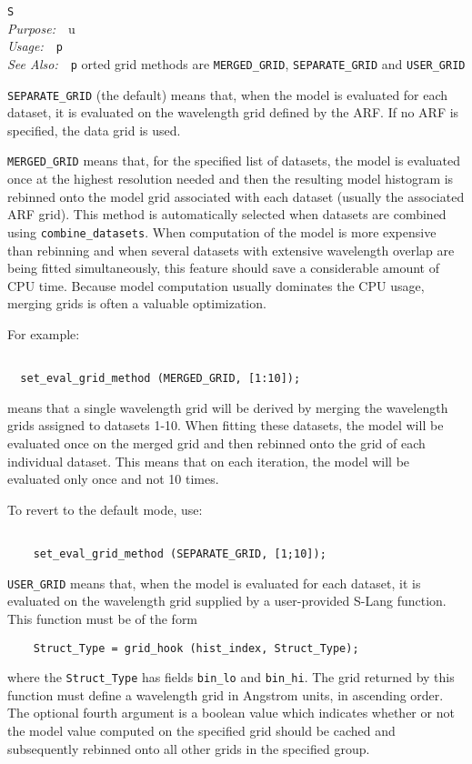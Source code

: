 \documentclass{book}
\makeatletter
\newif\ifpdf
\newenvironment{isisfunction}[4]%
{\index{{#1}@{\tt #1}}%
  \ifpdf
  \else
     \addcontentsline{toc}{subsection}{{#1} -- {#2}}
  \fi
  \vbox{
          \vspace*{\baselineskip}
          {\LARGE\tt #1}\vspace*{\baselineskip}\\
          {{\it Purpose:}~~{#2}}\\
          {{\it Usage:}~~{\tt #3}}\\
          {{\it See Also:}~~{\tt #4}}
       }
}%
{ }
\makeatother
\begin{document}
{\begin{isisfunction}
Supported grid methods are \verb|MERGED_GRID|,
\verb|SEPARATE_GRID| and \verb|USER_GRID|

\verb|SEPARATE_GRID| (the default) means that, when the model
is evaluated for each dataset, it is evaluated on the
wavelength grid defined by the ARF.  If no ARF is specified,
the data grid is used.

\verb|MERGED_GRID| means that, for the specified list of
datasets, the model is evaluated once at the highest resolution
needed and then the resulting model histogram is rebinned onto
the model grid associated with each dataset (usually the
associated ARF grid). This method is automatically
selected when datasets are combined using
\verb|combine_datasets|. When computation of the model is more
expensive than rebinning and when several datasets with
extensive wavelength overlap are being fitted simultaneously,
this feature should save a considerable amount of CPU time.
Because model computation usually dominates the CPU usage,
merging grids is often a valuable optimization.

For example:
\begin{verbatim}

  set_eval_grid_method (MERGED_GRID, [1:10]);

\end{verbatim}
means that a single wavelength grid will be derived by merging
the wavelength grids assigned to datasets 1-10.  When fitting
these datasets, the model will be evaluated once on the merged
grid and then rebinned onto the grid of each individual
dataset.  This means that on each iteration, the model will be
evaluated only once and not 10 times.

To revert to the default mode, use:
\begin{verbatim}

    set_eval_grid_method (SEPARATE_GRID, [1;10]);

\end{verbatim}

\verb|USER_GRID| means that, when the model is evaluated
for each dataset, it is evaluated on the wavelength grid
supplied by a user-provided S-Lang function.  This function
must be of the form
\begin{verbatim}
    Struct_Type = grid_hook (hist_index, Struct_Type);
\end{verbatim}
where the \verb|Struct_Type| has fields \verb|bin_lo| and
\verb|bin_hi|.  The grid returned by this function must
define a wavelength grid in Angstrom units, in ascending
order.  The optional fourth argument is a boolean value
which indicates whether or not the model value computed
on the specified grid should be cached and subsequently
rebinned onto all other grids in the specified group.


\end{isisfunction}}
\end{document}
